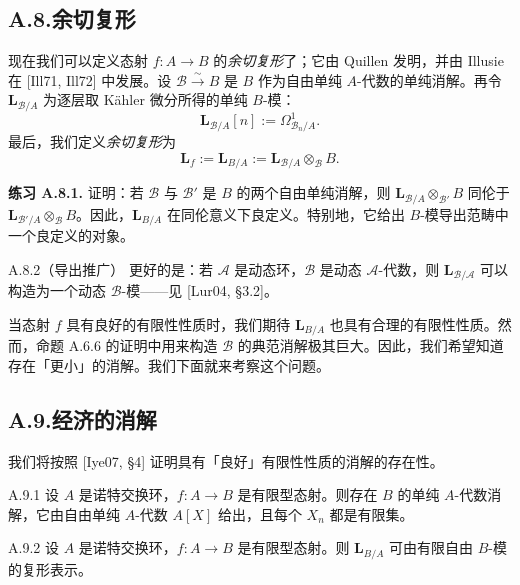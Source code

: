 \subsection*{A.8.\quad 余切复形}

现在我们可以定义态射 $f\colon A\to B$ 的\emph{余切复形}了；它由 Quillen 发明，并由 Illusie 在 [Ill71, Ill72] 中发展。设 $\mathcal B\xrightarrow{\sim}B$ 是 $B$ 作为自由单纯 $A$-代数的单纯消解。再令 $\mathbf L_{\mathcal B/A}$ 为逐层取 Kähler 微分所得的单纯 $B$-模：
\[
\mathbf L_{\mathcal B/A}[n]:=\Omega^1_{\mathcal B_n/A}.
\]
最后，我们定义\emph{余切复形}为
\[
\mathbf L_f:=\mathbf L_{B/A}:=\mathbf L_{\mathcal B/A}\otimes_{\mathcal B}B.
\]

\medskip\noindent\textbf{练习 A.8.1.} 证明：若 $\mathcal B$ 与 $\mathcal B'$ 是 $B$ 的两个自由单纯消解，则 $\mathbf L_{\mathcal B/A}\otimes_{\mathcal B'}B$ 同伦于 $\mathbf L_{\mathcal B'/A}\otimes_{\mathcal B}B$。因此，$\mathbf L_{B/A}$ 在同伦意义下良定义。特别地，它给出 $B$-模导出范畴中一个良定义的对象。

\begin{rem}{A.8.2}（导出推广）\label{thm:a6-07-13}
更好的是：若 $\mathcal A$ 是动态环，$\mathcal B$ 是动态 $\mathcal A$-代数，则 $\mathbf L_{\mathcal B/\mathcal A}$ 可以构造为一个动态 $\mathcal B$-模——见 [Lur04, §3.2]。
\end{rem}

当态射 $f$ 具有良好的有限性性质时，我们期待 $\mathbf L_{B/A}$ 也具有合理的有限性性质。然而，命题 A.6.6 的证明中用来构造 $\mathcal B$ 的典范消解极其巨大。因此，我们希望知道存在「更小」的消解。我们下面就来考察这个问题。

\subsection*{A.9.\quad 经济的消解}

我们将按照 [Iye07, §4] 证明具有「良好」有限性性质的消解的存在性。

\begin{prop}{A.9.1}\label{thm:a6-07-14}
设 $A$ 是诺特交换环，$f\colon A\to B$ 是有限型态射。则存在 $B$ 的单纯 $A$-代数消解，它由自由单纯 $A$-代数 $A[X]$ 给出，且每个 $X_n$ 都是有限集。
\end{prop}

\begin{cor}{A.9.2}\label{thm:a6-07-15}
设 $A$ 是诺特交换环，$f\colon A\to B$ 是有限型态射。则 $\mathbf L_{B/A}$ 可由有限自由 $B$-模的复形表示。
\end{cor}

